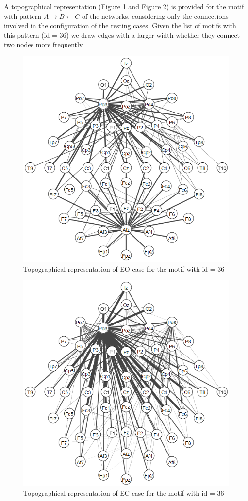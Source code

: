 \documentclass[%
 aip,
 jmp,%
 amsmath,amssymb,
 reprint,%
]{revtex4-1}
\begin{document}
A topographical representation (Figure \ref{fig:motifopen} and Figure \ref{fig:motifclosed}) is provided for the motif with pattern $ A\rightarrow B \leftarrow C $ of the networks, considering only the connections involved in the configuration of the resting cases. Given the list of motifs with this pattern (id = 36) we draw edges with a larger width whether they connect two nodes more frequently.
\\

\begin{figure}
	\centering
	\includegraphics[width=0.7\linewidth]{../motif_open}
	\caption{Topographical representation of EO case for the motif with id = 36}
	\label{fig:motifopen}
\end{figure}

\begin{figure}
	\centering
	\includegraphics[width=0.7\linewidth]{../motif_closed}
	\caption{Topographical representation of EC case for the motif with id = 36}
	\label{fig:motifclosed}
\end{figure}
\end{document}

